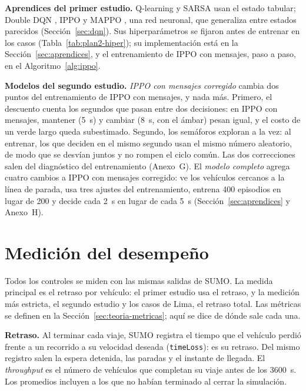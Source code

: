 \noindent\textbf{Aprendices del primer estudio.} Q-learning y SARSA
\citep{SuttonBarto2018} usan el estado tabular; Double DQN
\citep{Mnih2015_DQN}, IPPO y MAPPO \citep{Yu2021_MAPPO}, una red
neuronal, que generaliza entre estados parecidos
(Sección~\ref{sec:dqn}). Sus hiperparámetros se fijaron antes de
entrenar en los casos (Tabla~\ref{tab:plan2-hiper}); su implementación
está en la Sección~\ref{sec:aprendices}, y el entrenamiento de IPPO con
mensajes, paso a paso, en el Algoritmo~\ref{alg:ippo}.

\noindent\textbf{Modelos del segundo estudio.} \emph{IPPO con mensajes
corregido} cambia dos puntos del entrenamiento de IPPO con mensajes, y
nada más. Primero, el descuento cuenta los segundos que pasan entre dos
decisiones: en IPPO con mensajes, mantener (5~s) y cambiar (8~s, con el
ámbar) pesan igual, y el costo de un verde largo queda subestimado.
Segundo, los semáforos exploran a la vez: al entrenar, los que deciden
en el mismo segundo usan el mismo número aleatorio, de modo que se
desvían juntos y no rompen el ciclo común. Las dos correcciones salen
del diagnóstico del entrenamiento (Anexo~G). El \emph{modelo completo}
agrega cuatro cambios a IPPO con mensajes corregido: ve los vehículos
cercanos a la línea de parada, usa tres ajustes del entrenamiento,
entrena 400 episodios en lugar de 200 y decide cada 2~s en lugar de
cada 5~s (Sección~\ref{sec:aprendices} y Anexo~H).


\section{Medición del desempeño}
\label{sec:u3}

Todos los controles se miden con las mismas salidas de SUMO. La medida
principal es el retraso por vehículo: el primer estudio usa el retraso,
y la medición más estricta, el segundo estudio y los casos de Lima, el
retraso total. Las métricas se definen en la
Sección~\ref{sec:teoria-metricas}; aquí se dice de dónde sale cada una.

\noindent\textbf{Retraso.} Al terminar cada viaje, SUMO registra el
tiempo que el vehículo perdió frente a un recorrido a su velocidad
deseada (\texttt{timeLoss}): es su retraso. Del mismo registro salen la
espera detenida, las paradas y el instante de llegada. El
\textit{throughput} es el número de vehículos que completan su viaje
antes de los 3600~s. Los promedios incluyen a los que no habían
terminado al cerrar la simulación.

